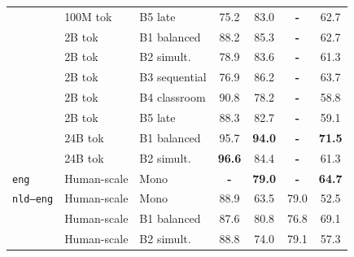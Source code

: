\documentclass[11pt]{article}
\begin{document}
\begin{table}[ht!]
\begin{minipage}[t]{0.49\linewidth}
\begin{tabular}{ll l cc cc}
 & 100M tok & B5 late & \cellcolor[rgb]{0.861,1.000,0.861} 75.2 & \cellcolor[rgb]{0.820,1.000,0.820} 83.0 & \textbf{-} & \cellcolor[rgb]{0.895,1.000,0.895} 62.7 \\
\addlinespace[1.5pt]
 & 2B tok & B1 balanced & \cellcolor[rgb]{0.789,1.000,0.789} 88.2 & \cellcolor[rgb]{0.807,1.000,0.807} 85.3 & \textbf{-} & \cellcolor[rgb]{0.895,1.000,0.895} 62.7 \\
 & 2B tok & B2 simult. & \cellcolor[rgb]{0.840,1.000,0.840} 78.9 & \cellcolor[rgb]{0.817,1.000,0.817} 83.6 & \textbf{-} & \cellcolor[rgb]{0.907,1.000,0.907} 61.3 \\
 & 2B tok & B3 sequential & \cellcolor[rgb]{0.851,1.000,0.851} 76.9 & \cellcolor[rgb]{0.803,1.000,0.803} 86.2 & \textbf{-} & \cellcolor[rgb]{0.887,1.000,0.887} 63.7 \\
 & 2B tok & B4 classroom & \cellcolor[rgb]{0.774,1.000,0.774} 90.8 & \cellcolor[rgb]{0.846,1.000,0.846} 78.2 & \textbf{-} & \cellcolor[rgb]{0.928,1.000,0.928} 58.8 \\
 & 2B tok & B5 late & \cellcolor[rgb]{0.788,1.000,0.788} 88.3 & \cellcolor[rgb]{0.822,1.000,0.822} 82.7 & \textbf{-} & \cellcolor[rgb]{0.925,1.000,0.925} 59.1 \\
\addlinespace[1.5pt]
 & 24B tok & B1 balanced & \cellcolor[rgb]{0.747,1.000,0.747} 95.7 & \cellcolor[rgb]{0.760,1.000,0.760} \textbf{94.0} & \textbf{-} & \cellcolor[rgb]{0.823,1.000,0.823} \textbf{71.5} \\
 & 24B tok & B2 simult. & \cellcolor[rgb]{0.742,1.000,0.742} \textbf{96.6} & \cellcolor[rgb]{0.812,1.000,0.812} 84.4 & \textbf{-} & \cellcolor[rgb]{0.907,1.000,0.907} 61.3 \\
\midrule
\texttt{eng} & Human-scale & Mono & \textbf{-} & \cellcolor[rgb]{0.842,1.000,0.842} \textbf{79.0} & \textbf{-} & \cellcolor[rgb]{0.879,1.000,0.879} \textbf{64.7} \\
\midrule
\texttt{nld--eng} & Human-scale & Mono & \cellcolor[rgb]{0.785,1.000,0.785} 88.9 & \cellcolor[rgb]{0.926,1.000,0.926} 63.5 & \cellcolor[rgb]{0.794,1.000,0.794} 79.0 & \cellcolor[rgb]{0.979,1.000,0.979} 52.5 \\
 & Human-scale & B1 balanced & \cellcolor[rgb]{0.792,1.000,0.792} 87.6 & \cellcolor[rgb]{0.832,1.000,0.832} 80.8 & \cellcolor[rgb]{0.810,1.000,0.810} 76.8 & \cellcolor[rgb]{0.843,1.000,0.843} 69.1 \\
 & Human-scale & B2 simult. & \cellcolor[rgb]{0.785,1.000,0.785} 88.8 & \cellcolor[rgb]{0.869,1.000,0.869} 74.0 & \cellcolor[rgb]{0.793,1.000,0.793} 79.1 & \cellcolor[rgb]{0.940,1.000,0.940} 57.3 \\

\end{tabular}
\end{minipage}
\end{table}
\end{document}
